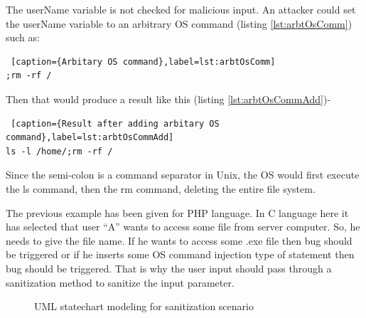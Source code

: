 The userName variable is not checked for malicious input. An attacker could set the userName variable to an arbitrary OS command (listing \ref{lst:arbtOsComm}) such as:
\begin{lstlisting} [caption={Arbitary OS command},label=lst:arbtOsComm]
;rm -rf /
\end{lstlisting}
Then that would produce a result like this (listing \ref{lst:arbtOsCommAdd})-
\begin{lstlisting} [caption={Result after adding arbitary OS command},label=lst:arbtOsCommAdd]
ls -l /home/;rm -rf /
\end{lstlisting}
Since the semi-colon is a command separator in Unix, the OS would first execute the ls command, then the rm command, deleting the entire file system.

The previous example has been given for PHP language. In C language here it has selected that user \enquote{A} wants to access some file from server computer. So, he needs to give the file name. If he wants to access some .exe file then bug should be triggered or if he inserts some OS command injection type of statement then bug should be triggered. That is why the user input should pass through a sanitization method to sanitize the input parameter.

\begin{figure}[htbp]
	\centering
	\label{fig:sanitization_scenario}
	\caption{UML statechart modeling for sanitization scenario}
\end{figure}

